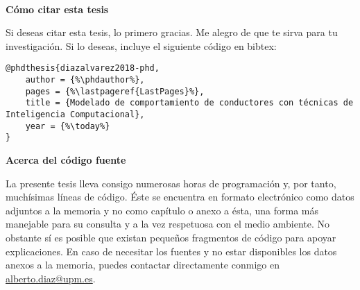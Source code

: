 \cleardoublepage
\begin{fullwidth}
~\vfill
\thispagestyle{empty}
\setlength{\parindent}{0pt}
\setlength{\parskip}{\baselineskip}

\par{
	\textbf{Cómo citar esta tesis}
	
	Si deseas citar esta tesis, lo primero gracias. Me alegro de que te sirva para tu investigación. Si lo deseas, incluye el siguiente código en bibtex:
	
	\begin{lstlisting}[escapechar=\%]
@phdthesis{diazalvarez2018-phd,
	author = {%\phdauthor%},
	pages = {%\lastpageref{LastPages}%},
	title = {Modelado de comportamiento de conductores con técnicas de Inteligencia Computacional},
	year = {%\today%}
}
	\end{lstlisting}
}

\par{
	\textbf{Acerca del código fuente}
	
	La presente tesis lleva consigo numerosas horas de programación y, por tanto, muchísimas líneas de código. Éste se encuentra en formato electrónico como datos adjuntos a la memoria y no como capítulo o anexo a ésta, una forma más manejable para su consulta y a la vez respetuosa con el medio ambiente. No obstante sí es posible que existan pequeños fragmentos de código para apoyar explicaciones. En caso de necesitar los fuentes y no estar disponibles los datos anexos a la memoria, puedes contactar directamente conmigo en \url{alberto.diaz@upm.es}.
}

\end{fullwidth}


